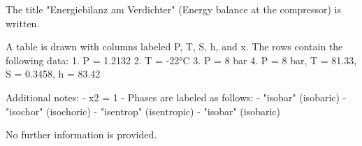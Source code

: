 The title "Energiebilanz am Verdichter" (Energy balance at the compressor) is written.  

A table is drawn with columns labeled P, T, S, h, and x. The rows contain the following data:  
1. P = 1.2132  
2. T = -22°C  
3. P = 8 bar  
4. P = 8 bar, T = 81.33, S = 0.3458, h = 83.42  

Additional notes:  
- x2 = 1  
- Phases are labeled as follows:  
  - "isobar" (isobaric)  
  - "isochor" (isochoric)  
  - "isentrop" (isentropic)  
  - "isobar" (isobaric)  

No further information is provided.